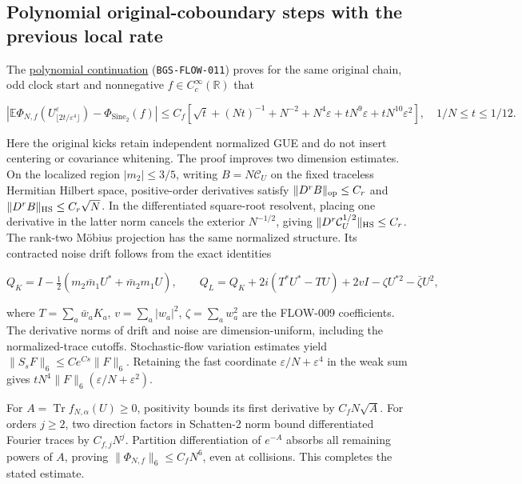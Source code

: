 \hypertarget{polynomial-original-coboundary-steps-with-the-previous-local-rate}{%
\subsection{Polynomial original-coboundary steps with the previous local rate}\label{polynomial-original-coboundary-steps-with-the-previous-local-rate}}

The \href{https://github.com/ChurilovMaksim/BGS/blob/main/mathematics/coboundary_polynomial_limit.md}{polynomial continuation}
(\texttt{BGS-FLOW-011}) proves for the same original chain, odd clock start and
nonnegative \(f\in C_c^\infty(\mathbb R)\) that

\[
\left|\mathbb E\Phi_{N,f}
(U^\varepsilon_{\lfloor2t/\varepsilon^4\rfloor})
-\Phi_{\mathrm{Sine}_2}(f)\right|
\le C_f[\sqrt t+(Nt)^{-1}+N^{-2}
+N^4\varepsilon+tN^9\varepsilon+tN^{10}\varepsilon^2],
\quad 1/N\le t\le1/12.
\]

Here the original kicks retain independent normalized GUE and do not
insert centering or covariance whitening. The proof improves two
dimension estimates. On the localized region \(|m_2|\le3/5\), writing
\(B=N\mathcal C_U\) on the fixed traceless Hermitian Hilbert space,
positive-order derivatives satisfy
\(\|D^rB\|_{\rm op}\le C_r\) and
\(\|D^rB\|_{\rm HS}\le C_r\sqrt N\).
In the differentiated square-root resolvent, placing one derivative in
the latter norm cancels the exterior \(N^{-1/2}\), giving
\(\|D^r\mathcal C_U^{1/2}\|_{\rm HS}\le C_r\).
The rank-two Möbius projection has the same normalized structure.
Its contracted noise drift follows from the exact identities

\[
Q_K=I-\tfrac12(m_2\bar m_1U^*+\bar m_2m_1U),\qquad
Q_L=Q_K+2i(T^*U^*-TU)+2vI-\zeta U^{*2}-\bar\zeta U^2,
\]

where \(T=\sum_a\bar w_aK_a\), \(v=\sum_a|w_a|^2\),
\(\zeta=\sum_aw_a^2\) are the FLOW-009 coefficients.
The derivative norms of drift and noise are dimension-uniform, including
the normalized-trace cutoffs. Stochastic-flow variation estimates yield
\(\|S_sF\|_6\le Ce^{Cs}\|F\|_6\). Retaining the fast coordinate
\(\varepsilon/N+\varepsilon^4\) in the weak sum gives
\(tN^4\|F\|_6(\varepsilon/N+\varepsilon^2)\).

For \(A=\operatorname{Tr}f_{N,\alpha}(U)\ge0\), positivity bounds its first
derivative by \(C_fN\sqrt A\). For orders \(j\ge2\), two direction factors
in Schatten-2 norm bound differentiated Fourier traces by \(C_{f,j}N^j\).
Partition differentiation of \(e^{-A}\) absorbs all remaining powers of
\(A\), proving \(\|\Phi_{N,f}\|_6\le C_fN^6\), even at collisions.
This completes the stated estimate.

